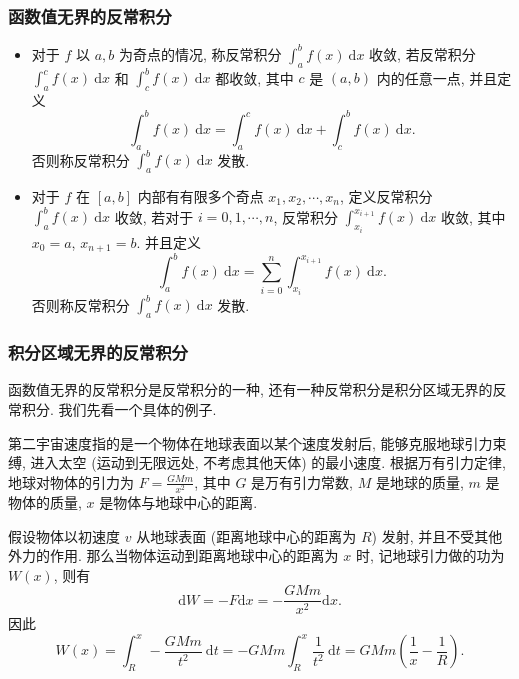 
\begin{frame}
\frametitle{函数值无界的反常积分}

\begin{remark}
\begin{itemize}
\item 对于 $f$ 以 $a, b$ 为奇点的情况, 称反常积分 $\int_a^b f(x) ~ \mathrm{d} x$ 收敛, 若反常积分 $\int_a^c f(x) ~ \mathrm{d} x$ 和 $\int_c^b f(x) ~ \mathrm{d} x$ 都收敛, 其中 $c$ 是 $(a, b)$ 内的任意一点, 并且定义
\[
\int_a^b f(x) ~ \mathrm{d} x = \int_a^c f(x) ~ \mathrm{d} x + \int_c^b f(x) ~ \mathrm{d} x.
\]
否则称反常积分 $\int_a^b f(x) ~ \mathrm{d} x$ 发散.
\pause
\vspace{-0.5em}
\item 对于 $f$ 在 $[a, b]$ 内部有有限多个奇点 $x_1, x_2, \cdots, x_n$, 定义反常积分 $\int_a^b f(x) ~ \mathrm{d} x$ 收敛, 若对于 $i = 0, 1, \cdots, n$, 反常积分 $\int_{x_i}^{x_{i + 1}} f(x) ~ \mathrm{d} x$ 收敛, 其中 $x_0 = a$, $x_{n + 1} = b$. 并且定义
\[
\int_a^b f(x) ~ \mathrm{d} x = \sum_{i = 0}^n \int_{x_i}^{x_{i + 1}} f(x) ~ \mathrm{d} x.
\]
否则称反常积分 $\int_a^b f(x) ~ \mathrm{d} x$ 发散.
\end{itemize}
\end{remark}

\end{frame}


\begin{frame}
\frametitle{积分区域无界的反常积分}

函数值无界的反常积分是反常积分的一种, 还有一种反常积分是积分区域无界的反常积分. 我们先看一个具体的例子.

\begin{eg}[由万有引力定律导出第二宇宙速度]
第二宇宙速度指的是一个物体在地球表面以某个速度发射后, 能够克服地球引力束缚, 进入太空 (运动到无限远处, 不考虑其他天体) 的最小速度. 根据万有引力定律, 地球对物体的引力为 $F = \frac{GMm}{x^2}$, 其中 $G$ 是万有引力常数, $M$ 是地球的质量, $m$ 是物体的质量, $x$ 是物体与地球中心的距离.

\pause
\vspace{0.5em}

假设物体以初速度 $v$ 从地球表面 (距离地球中心的距离为 $R$) 发射, 并且不受其他外力的作用. 那么当物体运动到距离地球中心的距离为 $x$ 时, 记地球引力做的功为 $W(x)$, 则有
\[
\mathrm{d} W = -F \mathrm{d} x = -\frac{GMm}{x^2} \mathrm{d} x.
\]
因此
\[
W(x) = \int_R^x -\frac{GMm}{t^2} ~ \mathrm{d} t = -GMm \int_R^x \frac{1}{t^2} ~ \mathrm{d} t = GMm \left(\frac{1}{x} - \frac{1}{R}\right).
\]
\end{eg}

\end{frame}

